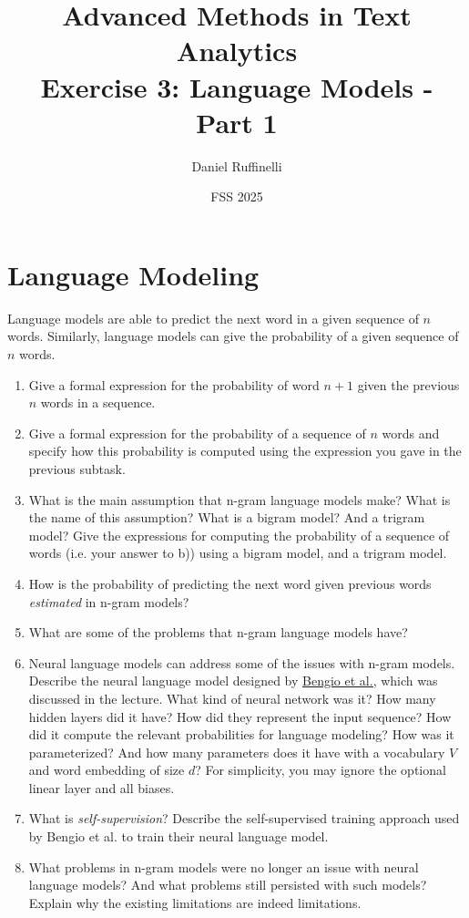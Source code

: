 \documentclass[11pt,a4paper]{article}
\title{Advanced Methods in Text Analytics \\ 
Exercise 3: Language Models - Part 1}
\author{Daniel Ruffinelli}
\date{FSS 2025}
\begin{document}
\maketitle

\section{Language Modeling}

Language models are able to predict the next word in a given sequence of $n$
words. Similarly, language models can give the probability of a given
sequence of $n$ words.

\begin{enumerate}[label=(\alph*)]
    \item Give a formal expression for the probability of word $n+1$ given the
          previous $n$ words in a sequence.
    \item Give a formal expression for the probability of a sequence of $n$
          words and specify how this probability is computed using the 
          expression you gave in the previous subtask.
    \item What is the main assumption that n-gram language models make?
          What is the name of this assumption?
          What is a bigram model? And a trigram model?
          Give the expressions for computing the probability of a sequence of
          words (i.e. your answer to b)) using a bigram model, and a trigram
          model.
    \item How is the probability of predicting the next word given previous
          words \emph{estimated} in n-gram models?
    \item What are some of the problems that n-gram language models have?
    \item Neural language models can address some of the issues with n-gram
          models.
          Describe the neural language model designed by
          \href{https://www.jmlr.org/papers/volume3/bengio03a/bengio03a.pdf}{\underline{Bengio et al.}},
          which was discussed in the lecture.
          What kind of neural network was it? How many hidden layers did it
          have? How did they represent the input sequence? How did it compute
          the relevant probabilities for language modeling?
          How was it parameterized? And how many parameters does it have with a
          vocabulary $V$ and word embedding of size $d$?
          For simplicity, you may ignore the optional linear layer and all
          biases.
    \item What is \emph{self-supervision}? Describe the self-supervised training
          approach used by Bengio et al. to train their neural language model.
    \item What problems in n-gram models were no longer an issue with neural
          language models? And what problems still persisted with such models?
          Explain why the existing limitations are indeed limitations.
\end{enumerate}
\end{document}
